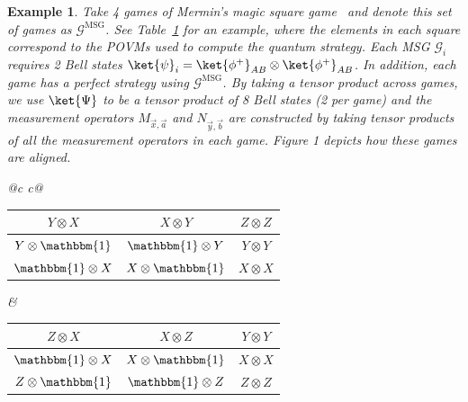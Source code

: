 \documentclass{article}
\newtheorem{example}{Example}
\begin{document}
\begin{example}
    Take 4 games of Mermin's magic square game~\cite{Mermin1990b} and denote this set of games as $\bm{\mathcal{G}}^{\text{MSG}}$. See Table~\ref{tab:fourmsgs} for an example, where the elements in each square correspond to the POVMs used to compute the quantum strategy. Each MSG $\mathcal{G}_i$ requires 2 Bell states $\ket{\psi}_i = \ket{\phi^+}_{AB}\otimes\ket{\phi^+}_{AB}$. In addition, each game has a perfect strategy using $\bm{\mathcal{G}}^{\text{MSG}}$. By taking a tensor product across games, we use $\ket{\Psi}$ to be a tensor product of 8 Bell states (2 per game) and the measurement operators $M_{\vec{x},\vec{a}}$ and $N_{\vec{y},\vec{b}}$ are constructed by taking tensor products of all the measurement operators in each game. Figure 1 depicts how these games are aligned.  

    \begin{table}[ht]
    \centering
    \label{tab:fourmsgs}

    \setlength{\tabcolsep}{10pt}
    \renewcommand{\arraystretch}{1.2}
    
    \begin{tabular}{@{}c c@{}}
      \\ 
      \begin{tabular}{|c|c|c|}
        \hline 
        $Y\otimes X$ & $X \otimes Y$ & $Z \otimes Z$ \\ \hline
        $Y\otimes \mathbbm{1}$ & $\mathbbm{1}\otimes Y$ & $Y \otimes Y$ \\ \hline
        $\mathbbm{1}\otimes X$ & $X \otimes \mathbbm{1}$ & $X \otimes X$ \\
        \hline
      \end{tabular}
      &
      \begin{tabular}{|c|c|c|}
        \hline
        $Z\otimes X$ & $X \otimes Z$ & $Y \otimes Y$ \\ \hline
        $\mathbbm{1}\otimes X$ & $X \otimes \mathbbm{1}$ & $X \otimes X$ \\ \hline
        $Z\otimes \mathbbm{1}$ & $\mathbbm{1}\otimes Z$ & $Z \otimes Z$ \\
        \hline
      \end{tabular}
      \\ \\
      

\end{tabular}
\end{table}
\end{example}
\end{document}
